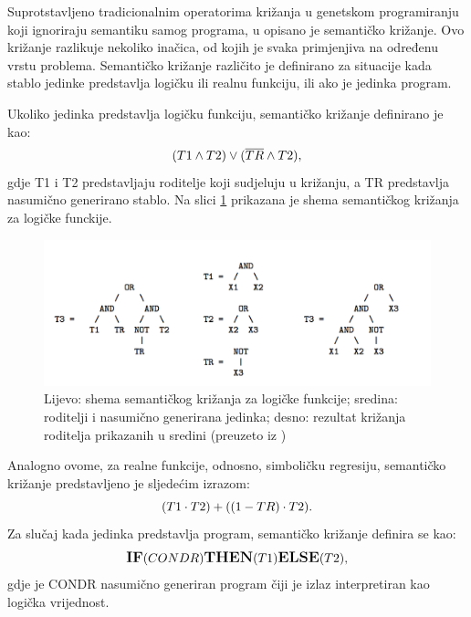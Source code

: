 Suprotstavljeno tradicionalnim operatorima križanja u genetskom programiranju koji ignoriraju semantiku samog programa, u \cite{crxSem} opisano je semantičko križanje. 
Ovo križanje razlikuje nekoliko inačica, od kojih je svaka primjenjiva na određenu vrstu problema. Semantičko križanje različito je definirano za situacije kada stablo jedinke predstavlja logičku ili realnu funkciju, ili ako je jedinka program.

Ukoliko jedinka predstavlja logičku funkciju, semantičko križanje definirano je kao:
 \begin{equation} 
\label{log}
 \large{ (T1 \land T2) \vee   (\overline{TR} \land T2) },
\end{equation}
gdje T1 i T2 predstavljaju roditelje koji sudjeluju u križanju, a TR predstavlja nasumično generirano stablo. Na slici \ref{semBool} prikazana je shema semantičkog križanja za logičke funckije.

 \begin{figure}[H]
	\centering
	\includegraphics[scale=0.4]{./slike/semBool1.png}
	\caption{Lijevo: shema semantičkog križanja za logičke funkcije; sredina: roditelji i nasumično generirana jedinka; desno: rezultat križanja roditelja prikazanih u sredini (preuzeto iz \cite{crxSem})}
	\label{semBool}
\end{figure}
  
   
     Analogno ovome, za realne funkcije, odnosno, simboličku regresiju, semantičko križanje predstavljeno je sljedećim izrazom:
 \begin{equation} 
\label{log}
 \large{ (T1 \cdot T2) +   ((1-TR) \cdot T2) }.
\end{equation}
Za slučaj kada jedinka predstavlja program, semantičko križanje definira se kao:
 \begin{equation} 
\label{log}
 \large{ \textbf{IF}(CONDR) \textbf{THEN} (T1) \textbf{ELSE} (T2)},
\end{equation}
gdje je CONDR nasumično generiran program čiji je izlaz interpretiran kao logička vrijednost.

